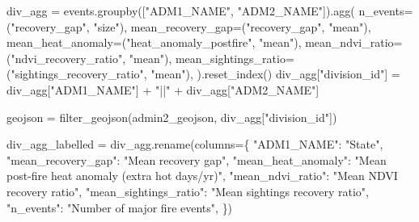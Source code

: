 \documentclass[
  letterpaper,
  DIV=11,
  numbers=noendperiod]{scrartcl}
\newenvironment{Shaded}{\begin{snugshade}}{\end{snugshade}}
\newcommand{\NormalTok}[1]{\textcolor[rgb]{0.00,0.23,0.31}{#1}}
\newcommand{\OperatorTok}[1]{\textcolor[rgb]{0.37,0.37,0.37}{#1}}
\newcommand{\StringTok}[1]{\textcolor[rgb]{0.13,0.47,0.30}{#1}}
\begin{document}
\begin{Shaded}
\begin{Highlighting}[]
\NormalTok{div\_agg }\OperatorTok{=}\NormalTok{ events.groupby([}\StringTok{"ADM1\_NAME"}\NormalTok{, }\StringTok{"ADM2\_NAME"}\NormalTok{]).agg(}
\NormalTok{    n\_events}\OperatorTok{=}\NormalTok{(}\StringTok{"recovery\_gap"}\NormalTok{, }\StringTok{"size"}\NormalTok{),}
\NormalTok{    mean\_recovery\_gap}\OperatorTok{=}\NormalTok{(}\StringTok{"recovery\_gap"}\NormalTok{, }\StringTok{"mean"}\NormalTok{),}
\NormalTok{    mean\_heat\_anomaly}\OperatorTok{=}\NormalTok{(}\StringTok{"heat\_anomaly\_postfire"}\NormalTok{, }\StringTok{"mean"}\NormalTok{),}
\NormalTok{    mean\_ndvi\_ratio}\OperatorTok{=}\NormalTok{(}\StringTok{"ndvi\_recovery\_ratio"}\NormalTok{, }\StringTok{"mean"}\NormalTok{),}
\NormalTok{    mean\_sightings\_ratio}\OperatorTok{=}\NormalTok{(}\StringTok{"sightings\_recovery\_ratio"}\NormalTok{, }\StringTok{"mean"}\NormalTok{),}
\NormalTok{).reset\_index()}
\NormalTok{div\_agg[}\StringTok{"division\_id"}\NormalTok{] }\OperatorTok{=}\NormalTok{ div\_agg[}\StringTok{"ADM1\_NAME"}\NormalTok{] }\OperatorTok{+} \StringTok{"||"} \OperatorTok{+}\NormalTok{ div\_agg[}\StringTok{"ADM2\_NAME"}\NormalTok{]}

\NormalTok{geojson }\OperatorTok{=}\NormalTok{ filter\_geojson(admin2\_geojson, div\_agg[}\StringTok{"division\_id"}\NormalTok{])}

\NormalTok{div\_agg\_labelled }\OperatorTok{=}\NormalTok{ div\_agg.rename(columns}\OperatorTok{=}\NormalTok{\{}
    \StringTok{"ADM1\_NAME"}\NormalTok{: }\StringTok{"State"}\NormalTok{, }\StringTok{"mean\_recovery\_gap"}\NormalTok{: }\StringTok{"Mean recovery gap"}\NormalTok{,}
    \StringTok{"mean\_heat\_anomaly"}\NormalTok{: }\StringTok{"Mean post{-}fire heat anomaly (extra hot days/yr)"}\NormalTok{,}
    \StringTok{"mean\_ndvi\_ratio"}\NormalTok{: }\StringTok{"Mean NDVI recovery ratio"}\NormalTok{, }\StringTok{"mean\_sightings\_ratio"}\NormalTok{: }\StringTok{"Mean sightings recovery ratio"}\NormalTok{,}
    \StringTok{"n\_events"}\NormalTok{: }\StringTok{"Number of major fire events"}\NormalTok{,}
\NormalTok{\})}


\end{Highlighting}
\end{Shaded}
\end{document}

